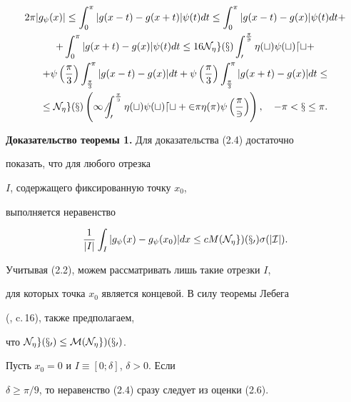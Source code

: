 \begin{multline}


2\pi|g_\psi(x)|\le\int_0^\pi|g(x-t)-g(x+t)|\psi(t)dt\le


\int_0^\pi|g(x-t)-g(x)|\psi(t)dt+ \\


%


+\int_0^\pi|g(x+t)-g(x)|\psi(t)dt\le 16\N_\eta g(x)\int_0^{\frac{\pi}{3}}


\eta(t)\psi(t)dt+ \\


%


+\psi\left(\frac{\pi}{3}\right)


\int_{\frac{\pi}{3}}^\pi|g(x-t)-g(x)|dt+


\psi\left(\frac{\pi}{3}\right)\int_{\frac{\pi}{3}}^\pi|g(x+t)-g(x)|dt\le\\


%


\le\N_\eta g(x)\left(16\int_0^{\frac{\pi}{3}}\eta(t)\psi(t)dt


+2\pi\eta(\pi)\psi\left(\frac{\pi}{3}


\right)\right),


\quad -\pi<x\le\pi.


\end{multline}





{\bf Доказательство теоремы 1.} Для доказательства (2.4) достаточно


показать, что для любого отрезка


$I$, содержащего фиксированную точку $x_0$,


выполняется неравенство


$$


\frac{1}{|I|}\int_I|g_\psi(x)-g_\psi(x_0)|dx\le cM(\N_\eta g)(x_0)\sigma(|I|).


$$


Учитывая (2.2), можем рассматривать лишь такие отрезки $I$,


для которых точка $x_0$ является концевой. В силу теоремы Лебега


(\cite{leb}, c.\,16), также предполагаем,


что $\cal N_\eta g(x_0)\le M(\cal N_\eta g)(x_0)$.





Пусть $x_0=0$ и $I\equiv[0;\delta]$, $\delta>0$. Если


$\delta\ge\pi/9$, то неравенство (2.4) сразу следует из оценки (2.6).


